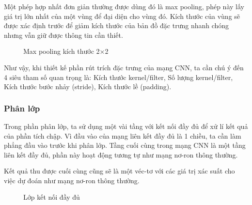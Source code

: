 Một phép hợp nhất đơn giản thường được dùng đó là max pooling, phép này lấy giá trị lớn nhất của một vùng để đại diện cho vùng đó. Kích thước của vùng sẽ được xác định trước để giảm kích thước của bản đồ đặc trưng nhanh chóng nhưng vẫn giữ được thông tin cần thiết.

\begin{figure}
	\caption{Max pooling kích thước 2×2}
\end{figure}

Như vậy, khi thiết kế phần rút trích đặc trưng của mạng CNN, ta cần chú ý đến 4 siêu tham số quan trọng là: Kích thước kernel/filter, Số lượng kernel/filter, Kích thước bước nhảy (stride), Kích thước lề (padding).

\subsubsection{Phân lớp}
Trong phần phân lớp, ta sử dụng một vài tầng với kết nối đầy đủ để xử lí kết quả của phần tích chập. Vì đầu vào của mạng liên kết đầy đủ là 1 chiều, ta cần làm phẳng đầu vào trước khi phân lớp. Tầng cuối cùng trong mạng CNN là một tầng liên kết đầy đủ, phần này hoạt động tương tự như mạng nơ-ron thông thường.

Kết quả thu được cuối cùng cũng sẽ là một véc-tơ với các giá trị xác suất cho việc dự đoán như mạng nơ-ron thông thường.

\begin{figure}
	\caption{Lớp kết nối đầy đủ}
\end{figure}
